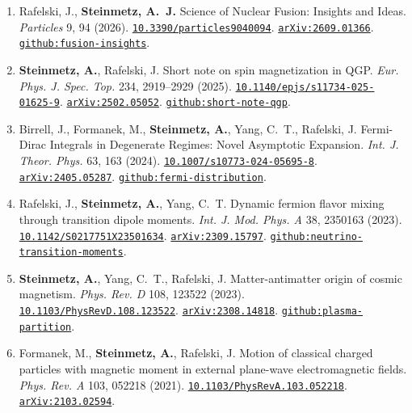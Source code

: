 \documentclass[11pt]{article}
\begin{document}
\begin{enumerate}[leftmargin=*,nosep]
    \item Rafelski, J., \textbf{Steinmetz, A.~J.} Science of Nuclear Fusion: Insights and Ideas. \textit{Particles} 9, 94 (2026). \href{https://doi.org/10.3390/particles9040094}{\nolinkurl{10.3390/particles9040094}}. \href{https://arxiv.org/abs/2609.01366}{\nolinkurl{arXiv:2609.01366}}. \href{https://github.com/ajsteinmetz/fusion-insights}{\nolinkurl{github:fusion-insights}}.
    \item \textbf{Steinmetz, A.}, Rafelski, J. Short note on spin magnetization in QGP. \textit{Eur. Phys. J. Spec. Top.} 234, 2919--2929 (2025). \href{https://doi.org/10.1140/epjs/s11734-025-01625-9}{\nolinkurl{10.1140/epjs/s11734-025-01625-9}}. \href{https://arxiv.org/abs/2502.05052}{\nolinkurl{arXiv:2502.05052}}. \href{https://github.com/ajsteinmetz/short-note-qgp}{\nolinkurl{github:short-note-qgp}}.
    \item Birrell, J., Formanek, M., \textbf{Steinmetz, A.}, Yang, C.~T., Rafelski, J. Fermi-Dirac Integrals in Degenerate Regimes: Novel Asymptotic Expansion. \textit{Int. J. Theor. Phys.} 63, 163 (2024). \href{https://doi.org/10.1007/s10773-024-05695-8}{\nolinkurl{10.1007/s10773-024-05695-8}}. \href{https://arxiv.org/abs/2405.05287}{\nolinkurl{arXiv:2405.05287}}. \href{https://github.com/ajsteinmetz/fermi-distribution}{\nolinkurl{github:fermi-distribution}}.
    \item Rafelski, J., \textbf{Steinmetz, A.}, Yang, C.~T. Dynamic fermion flavor mixing through transition dipole moments. \textit{Int. J. Mod. Phys. A} 38, 2350163 (2023). \href{https://doi.org/10.1142/S0217751X23501634}{\nolinkurl{10.1142/S0217751X23501634}}. \href{https://arxiv.org/abs/2309.15797}{\nolinkurl{arXiv:2309.15797}}. \href{https://github.com/ajsteinmetz/neutrino-transition-moments}{\nolinkurl{github:neutrino-transition-moments}}.
    \item \textbf{Steinmetz, A.}, Yang, C.~T., Rafelski, J. Matter-antimatter origin of cosmic magnetism. \textit{Phys. Rev. D} 108, 123522 (2023). \href{https://doi.org/10.1103/PhysRevD.108.123522}{\nolinkurl{10.1103/PhysRevD.108.123522}}. \href{https://arxiv.org/abs/2308.14818}{\nolinkurl{arXiv:2308.14818}}. \href{https://github.com/ajsteinmetz/plasma-partition}{\nolinkurl{github:plasma-partition}}.
    \item Formanek, M., \textbf{Steinmetz, A.}, Rafelski, J. Motion of classical charged particles with magnetic moment in external plane-wave electromagnetic fields. \textit{Phys. Rev. A} 103, 052218 (2021). \href{https://doi.org/10.1103/PhysRevA.103.052218}{\nolinkurl{10.1103/PhysRevA.103.052218}}. \href{https://arxiv.org/abs/2103.02594}{\nolinkurl{arXiv:2103.02594}}.

\end{enumerate}
\end{document}
